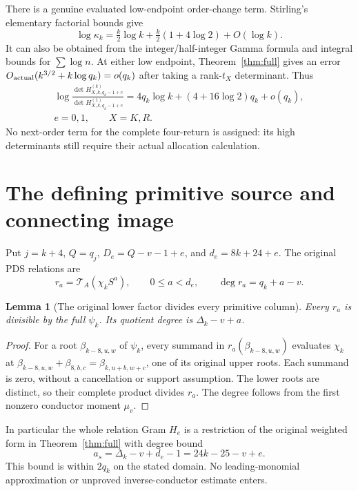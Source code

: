 \documentclass[11pt,a4paper]{article}
\newtheorem{lemma}[theorem]{Lemma}
\begin{document}
There is a genuine evaluated low-endpoint order-change term. Stirling's elementary factorial bounds give
\begin{equation}
 \log\kappa_k=\tfrac{k}{2}\log k+\tfrac{k}{2}(1+4\log2)+O(\log k).
 \label{eq:kappaasym}
\end{equation}
It can also be obtained from the integer/half-integer Gamma formula and integral bounds for $\sum\log n$. At either low endpoint, Theorem~\ref{thm:full} gives an error $O_{\rm actual}(k^{3/2}+k\log q_k)=o(q_k)$ after taking a rank-$t_X$ determinant. Thus
\begin{equation}
\boxed{\begin{gathered}
 \log\frac{\det H_{X,k,q_k-1+e}^{(k)}}{
                 \det H_{X,k,q_k-1+e}^{(1)}}
 =4q_k\log k+(4+16\log2)q_k+o(q_k),\\
 e=0,1,\qquad X=K,R.
\end{gathered}}
\label{eq:lowprimal}
\end{equation}
No next-order term for the complete four-return is assigned: its high determinants still require their actual allocation calculation.

\section{The defining primitive source and connecting image}
Put $j=k+4$, $Q=q_j$, $D_e=Q-v-1+e$, and $d_e=8k+24+e$. The original PDS relations are
\[
 r_a=\mathcal T_A(\chi_k S^a),\qquad 0\le a<d_e,
 \qquad \deg r_a=q_k+a-v.
\]
\begin{lemma}[The original lower factor divides every primitive column]\label{lem:divide}
Every $r_a$ is divisible by the full $\psi_k$. Its quotient degree is $\Delta_k-v+a$.
\end{lemma}
\begin{proof}
For a root $\beta_{k-8,u,w}$ of $\psi_k$, every summand in $r_a(\beta_{k-8,u,w})$ evaluates $\chi_k$ at
$\beta_{k-8,u,w}+\beta_{8,b,c}=\beta_{k,u+b,w+c}$, one of its original upper roots. Each summand is zero, without a cancellation or support assumption. The lower roots are distinct, so their complete product divides $r_a$. The degree follows from the first nonzero conductor moment $\mu_v$.
\end{proof}
In particular the whole relation Gram $H_e$ is a restriction of the original weighted form in Theorem~\ref{thm:full} with degree bound
\begin{equation}
 a_s=\Delta_k-v+d_e-1=24k-25-v+e .
 \label{eq:asrc}
\end{equation}
This bound is within $2q_k$ on the stated domain. No leading-monomial approximation or unproved inverse-conductor estimate enters.
\end{document}
